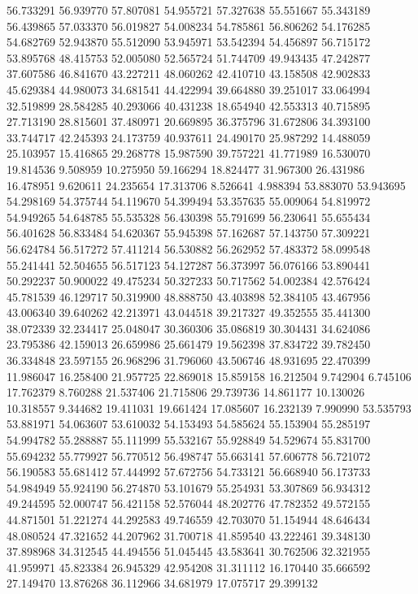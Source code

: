 56.733291
56.939770
57.807081
54.955721
57.327638
55.551667
55.343189
56.439865
57.033370
56.019827
54.008234
54.785861
56.806262
54.176285
54.682769
52.943870
55.512090
53.945971
53.542394
54.456897
56.715172
53.895768
48.415753
52.005080
52.565724
51.744709
49.943435
47.242877
37.607586
46.841670
43.227211
48.060262
42.410710
43.158508
42.902833
45.629384
44.980073
34.681541
44.422994
39.664880
39.251017
33.064994
32.519899
28.584285
40.293066
40.431238
18.654940
42.553313
40.715895
27.713190
28.815601
37.480971
20.669895
36.375796
31.672806
34.393100
33.744717
42.245393
24.173759
40.937611
24.490170
25.987292
14.488059
25.103957
15.416865
29.268778
15.987590
39.757221
41.771989
16.530070
19.814536
9.508959
10.275950
59.166294
18.824477
31.967300
26.431986
16.478951
9.620611
24.235654
17.313706
8.526641
4.988394
53.883070
53.943695
54.298169
54.375744
54.119670
54.399494
53.357635
55.009064
54.819972
54.949265
54.648785
55.535328
56.430398
55.791699
56.230641
55.655434
56.401628
56.833484
54.620367
55.945398
57.162687
57.143750
57.309221
56.624784
56.517272
57.411214
56.530882
56.262952
57.483372
58.099548
55.241441
52.504655
56.517123
54.127287
56.373997
56.076166
53.890441
50.292237
50.900022
49.475234
50.327233
50.717562
54.002384
42.576424
45.781539
46.129717
50.319900
48.888750
43.403898
52.384105
43.467956
43.006340
39.640262
42.213971
43.044518
39.217327
49.352555
35.441300
38.072339
32.234417
25.048047
30.360306
35.086819
30.304431
34.624086
23.795386
42.159013
26.659986
25.661479
19.562398
37.834722
39.782450
36.334848
23.597155
26.968296
31.796060
43.506746
48.931695
22.470399
11.986047
16.258400
21.957725
22.869018
15.859158
16.212504
9.742904
6.745106
17.762379
8.760288
21.537406
21.715806
29.739736
14.861177
10.130026
10.318557
9.344682
19.411031
19.661424
17.085607
16.232139
7.990990
53.535793
53.881971
54.063607
53.610032
54.153493
54.585624
55.153904
55.285197
54.994782
55.288887
55.111999
55.532167
55.928849
54.529674
55.831700
55.694232
55.779927
56.770512
56.498747
55.663141
57.606778
56.721072
56.190583
55.681412
57.444992
57.672756
54.733121
56.668940
56.173733
54.984949
55.924190
56.274870
53.101679
55.254931
53.307869
56.934312
49.244595
52.000747
56.421158
52.576044
48.202776
47.782352
49.572155
44.871501
51.221274
44.292583
49.746559
42.703070
51.154944
48.646434
48.080524
47.321652
44.207962
31.700718
41.859540
43.222461
39.348130
37.898968
34.312545
44.494556
51.045445
43.583641
30.762506
32.321955
41.959971
45.823384
26.945329
42.954208
31.311112
16.170440
35.666592
27.149470
13.876268
36.112966
34.681979
17.075717
29.399132
